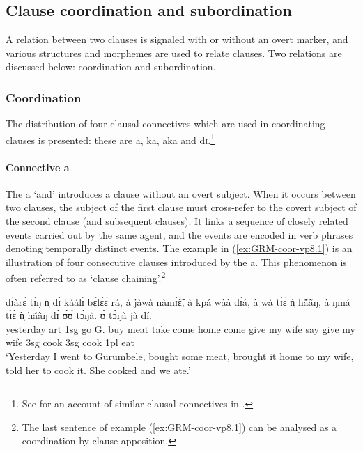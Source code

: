 \subsection{Clause coordination and subordination}
\label{GRM-clause-coord-subord}

A relation between two clauses is signaled with or without an overt marker,  and 
various  structures and morphemes  are used to relate clauses.  Two
relations are discussed below: coordination and subordination. 

\subsubsection{Coordination}
\label{GRM-clause-coord}


The distribution of four clausal connectives which are used in coordinating
clauses is presented: these are {\sls a}, {\sls ka}, {\sls aka} and {\sls 
dɪ}.\footnote{See \citet[143--149]{mcgi99} for an account of similar clausal
connectives in .}  


\paragraph{Connective {\sls a}}
\label{GRM-clause-coord-a}


The  {\sls a} `and'  introduces a clause without an overt subject.  When 
it occurs between two clauses, the subject of the first clause must 
cross-refer to the covert subject of the second clause  (and subsequent 
clauses). It links a sequence of closely related events carried out by the same 
agent, and the events are encoded in  verb phrases denoting temporally distinct 
events. The example in (\ref{ex:GRM-coor-vp8.1}) is  an illustration of four 
consecutive clauses introduced by the   {\sls a}.   This phenomenon 
is often referred to as `clause chaining'.\footnote{The last sentence of example (\ref{ex:GRM-coor-vp8.1}) can be analysed as a coordination by clause apposition.}

\ea\label{ex:GRM-coor-vp8.1}
\gll dɪ̀àrɛ̀ tɪ̀ŋ ǹ̩ dɪ̀ káálɪ́ bɛ̀lɛ̀ɛ̀ rá, à {\ob}jàwà nàmɪ̃̀ɛ̃́{\cb}, à 
{\ob}kpá wàà dɪ̀á{\cb}, à  {\ob}wà tɪ̀ɛ̀ ǹ̩ hã́ã̀ŋ{\cb}, à {\ob}ŋmá tɪ̀ɛ̀ ǹ̩ hã́ã̀ŋ{\cb} 
dɪ́ ʊ́ʊ́ tɔ́ŋà. ʊ̀ tɔ̀ŋà jà dí.\\
yesterday {\sc art} {\sc 1sg} {\hest} {go} {G.}  {\foc} {\conn}   buy meat
{\conn}  take come home {\conn}  come give my wife  {\conn}  say give my wife
{\comp}  {\sc 3sg}   {cook} {\sc 3sg}   {cook}  {\sc 1pl} {eat}\\
\glt  `Yesterday I went to Gurumbele,  bought some meat, brought it
home to my wife, told her to cook it. She cooked and we ate.'
\z


